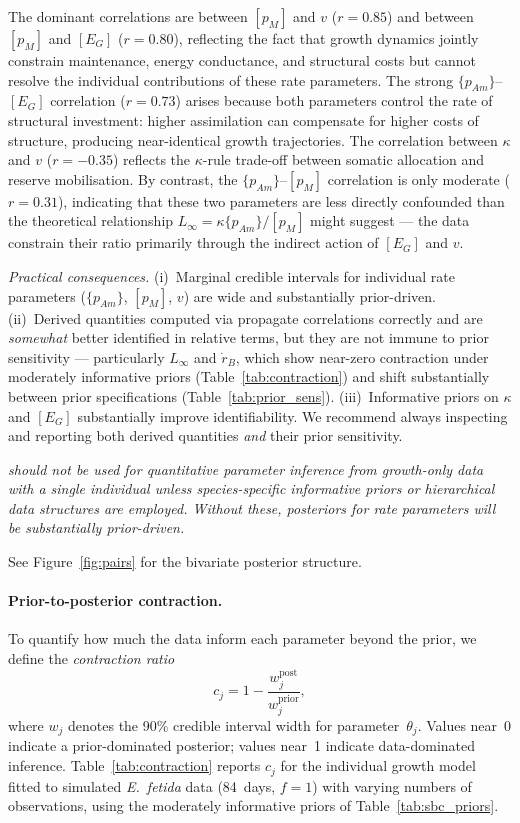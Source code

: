 \documentclass[article,shortnames]{jss}
\newcommand{\pAm}{\{p_{Am}\}}
\newcommand{\pM}{[p_M]}
\newcommand{\EG}{[E_G]}
\begin{document}

The dominant correlations are between $\pM$ and $v$ ($r = 0.85$)
and between $\pM$ and $\EG$ ($r = 0.80$), reflecting the fact that
growth dynamics jointly constrain maintenance, energy conductance,
and structural costs but cannot resolve the individual contributions
of these rate parameters.  The strong $\pAm$--$\EG$ correlation
($r = 0.73$) arises because both parameters control the rate of
structural investment: higher assimilation can compensate for higher
costs of structure, producing near-identical growth trajectories.
The correlation between $\kappa$ and $v$ ($r = -0.35$) reflects
the $\kappa$-rule trade-off between somatic allocation and reserve
mobilisation.  By contrast, the $\pAm$--$\pM$ correlation is only
moderate ($r = 0.31$), indicating that these two parameters are less
directly confounded than the theoretical relationship
$L_\infty = \kappa \pAm / \pM$ might suggest --- the data constrain
their ratio primarily through the indirect action of $\EG$ and $v$.

\emph{Practical consequences.}  (i)~Marginal credible intervals for
individual rate parameters ($\pAm$, $\pM$, $v$) are wide and
substantially prior-driven.
(ii)~Derived quantities computed via  propagate
correlations correctly and are \emph{somewhat} better identified
in relative terms, but they are not immune to prior sensitivity
--- particularly $L_\infty$ and $\dot{r}_B$, which show near-zero
contraction under moderately informative priors
(Table~\ref{tab:contraction}) and shift substantially between prior
specifications (Table~\ref{tab:prior_sens}).
(iii)~Informative priors on $\kappa$ and $\EG$ substantially improve
identifiability.  We recommend always inspecting
 and reporting both derived
quantities \emph{and} their prior sensitivity.

\emph{ should not be used for quantitative
parameter inference from growth-only data with a single individual
unless species-specific informative priors or hierarchical data
structures are employed.  Without these, posteriors for rate
parameters will be substantially prior-driven.}

See Figure~\ref{fig:pairs} for the bivariate posterior structure.

\paragraph{Prior-to-posterior contraction.}
To quantify how much the data inform each parameter beyond the
prior, we define the \emph{contraction ratio}
\begin{equation}
  c_j = 1 - \frac{w_j^{\mathrm{post}}}{w_j^{\mathrm{prior}}},
  \label{eq:contraction}
\end{equation}
where $w_j$ denotes the 90\% credible interval width for
parameter~$\theta_j$.  Values near~0 indicate a prior-dominated
posterior; values near~1 indicate data-dominated inference.
Table~\ref{tab:contraction} reports $c_j$ for the individual growth
model fitted to simulated \emph{E.~fetida} data (84~days, $f = 1$)
with varying numbers of observations, using the moderately
informative priors of Table~\ref{tab:sbc_priors}.
\end{document}
